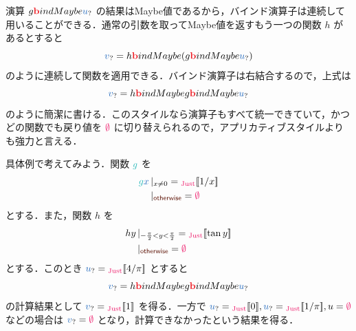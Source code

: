 \documentclass[a5paper,twoside,fleqn,draft]{jsbook}
\begin{document}
演算 $g\hTypeName{b}indMaybe\hMaybeVar{u}$ の結果はMaybe値であるから，バインド演算子は連続して用いることができる．通常の引数を取ってMaybe値を返すもう一つの関数 $h$ があるとすると
\begin{equation}
  \hMaybeVar{v}=h\hTypeName{b}indMaybe{}(g\hTypeName{b}indMaybe\hMaybeVar{u})
\end{equation}
のように連続して関数を適用できる．バインド演算子は右結合するので，上式は
\begin{equation}
  \label{eq:maybe-z-bind-style}
  \hMaybeVar{v}=h\hTypeName{b}indMaybe g\hTypeName{b}indMaybe\hMaybeVar{u}
\end{equation}
のように簡潔に書ける．このスタイルなら演算子もすべて統一できていて，かつどの関数でも戻り値を $\hNothing$ に切り替えられるので，アプリカティブスタイルよりも強力と言える．

具体例で考えてみよう．関数 $\hFunc{g}$ を
\begin{equation}
  \begin{aligned}
    \hFunc{g}\hVar{x}&\hGuard{x\neq0}=\hJustWith{1/x}\\
    &\hGuard{\hOtherwise}=\hNothing
  \end{aligned}
\end{equation}
とする．また，関数 $h$ を
\begin{equation}
  \begin{aligned}
    hy&\hGuard{-\frac{\pi}{2}<y<\frac{\pi}{2}}=\hJustWith{\tan y}\\
    &\hGuard{\hOtherwise}=\hNothing
  \end{aligned}
\end{equation}
とする．このとき $\hMaybeVar{u}=\hJustWith{4/\pi}$ とすると
\begin{equation}
\hMaybeVar{v}=h\hTypeName{b}indMaybe g\hTypeName{b}indMaybe\hMaybeVar{u}
\end{equation}
の計算結果として $\hMaybeVar{v}=\hJustWith{1}$ を得る．一方で $\hMaybeVar{u}=\hJustWith{0},\hMaybeVar{u}=\hJustWith{1/\pi},u=\hNothing$ などの場合は $\hMaybeVar{v}=\hNothing$ となり，計算できなかったという結果を得る．

\end{document}
